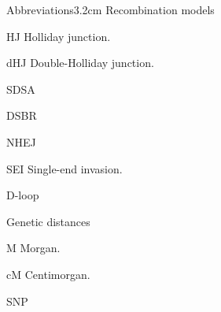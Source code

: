 \begin{mclistof}{Abbreviations}{3.2cm}
Recombination models
\item[HJ] Holliday junction.
\item[dHJ] Double-Holliday junction.
\item[SDSA]
\item[DSBR]
\item[NHEJ]
\item[SEI] Single-end invasion.
\item[D-loop]


	Genetic distances
\item[M] Morgan.
\item[cM] Centimorgan.
\item[SNP]





\end{mclistof}




